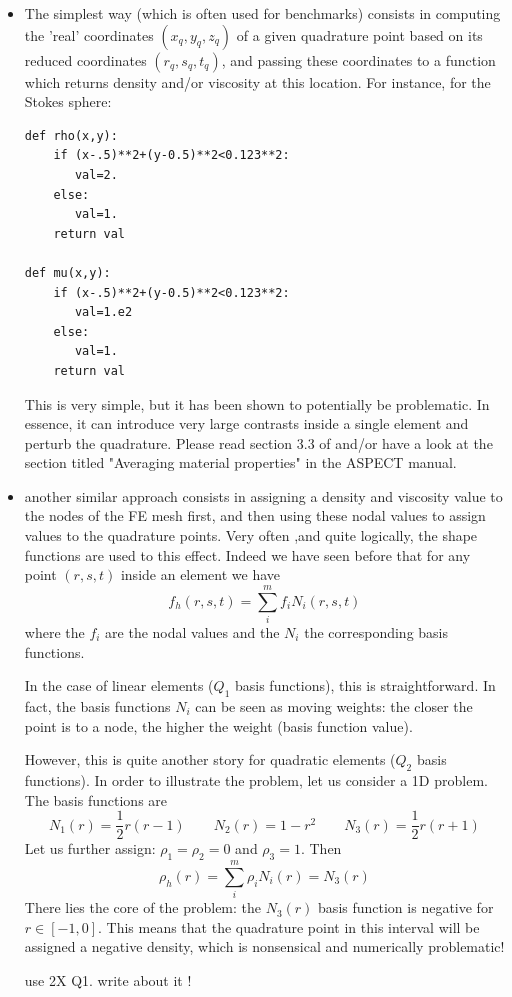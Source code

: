 \documentclass[a4paper]{article}
\begin{document}
\begin{itemize}
\item The simplest way (which is often used for benchmarks) consists in computing the 'real'
coordinates $(x_q,y_q,z_q)$ of a given quadrature point based on its reduced coordinates 
$(r_q,s_q,t_q)$, and passing these coordinates to a function which returns density and/or viscosity
at this location. For instance, for the Stokes sphere:
\begin{verbatim}
def rho(x,y):
    if (x-.5)**2+(y-0.5)**2<0.123**2:
       val=2.
    else:
       val=1.
    return val

def mu(x,y):
    if (x-.5)**2+(y-0.5)**2<0.123**2:
       val=1.e2
    else:
       val=1.
    return val
\end{verbatim}
This is very simple, but it has been shown to potentially be problematic. In essence, it can introduce very large contrasts inside a single element and perturb the quadrature. Please read section 3.3 of \cite{hedg17} and/or
have a look at the section titled "Averaging material properties" in the ASPECT manual.

\item another similar approach consists in assigning a density and viscosity value to the nodes of the FE mesh first, and then using these nodal values to assign values to the quadrature points. Very often ,and quite logically, the shape functions are used to this effect. Indeed we have seen before that for any point $(r,s,t)$ inside an element we have
\[
f_h(r,s,t) = \sum_{i}^m f_i N_i(r,s,t)
\]  
where the $f_i$ are the nodal values and the $N_i$ the corresponding basis functions. 

In the case of linear elements ($Q_1$ basis functions), this is straightforward. In fact, the basis functions $N_i$ can be seen as moving weights: the closer the point is to a node, the higher the weight (basis function value). 

However, this is quite another story for quadratic elements ($Q_2$ basis functions). In order to illustrate the 
problem, let us consider a 1D problem. The basis functions are 
\[
N_1(r) =\frac{1}{2}r(r-1)
\quad\quad
N_2(r)=1-r^2
\quad\quad
N_3(r) =\frac{1}{2}r(r+1)
\]
Let us further assign: $\rho_1=\rho_2=0$ and $\rho_3=1$. Then 
\[
\rho_h(r) = \sum_{i}^m \rho_i N_i(r) = N_3(r)
\]  
There lies the core of the problem: the $N_3(r)$ basis function is negative for $r\in[-1,0]$. This means that the quadrature point in this interval will be assigned a negative density, which is nonsensical and numerically problematic!

{\color{red} use 2X Q1. write about it !}

\end{itemize}
\end{document}
